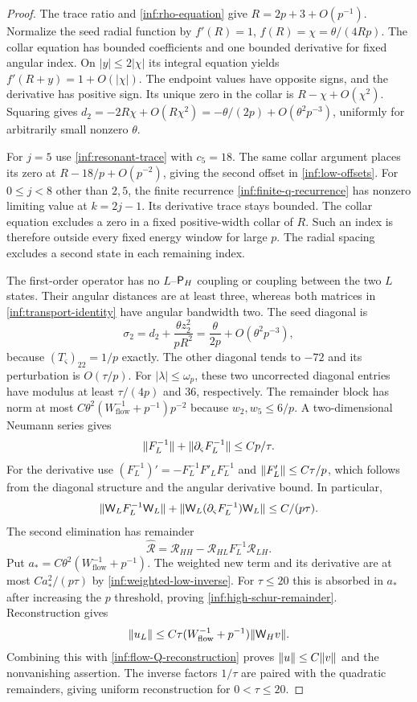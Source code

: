 \begin{proof}
The trace ratio and \eqref{inf:rho-equation} give
$R=2p+3+O(p^{-1})$. Normalize the seed radial function by
$f'(R)=1$, $f(R)=\chi=\theta/(4Rp)$.
The collar equation has bounded coefficients and one bounded
derivative for fixed angular index. On $|y|\le2|\chi|$ its integral
equation yields $f'(R+y)=1+O(|\chi|)$. The endpoint values have
opposite signs, and the derivative has positive sign.
Its unique zero in the collar is
$R-\chi+O(\chi^2)$. Squaring gives
$d_2=-2R\chi+O(R\chi^2)=-\theta/(2p)+O(\theta^2p^{-3})$,
uniformly for arbitrarily small nonzero $\theta$.

For $j=5$ use \eqref{inf:resonant-trace} with $c_5=18$.
The same collar argument places its zero at
$R-18/p+O(p^{-2})$, giving the second offset in
\eqref{inf:low-offsets}. For $0\le j<8$ other than $2,5$, the
finite recurrence \eqref{inf:finite-q-recurrence} has nonzero
limiting value at $k=2j-1$. Its derivative trace stays bounded.
The collar equation excludes a zero in a fixed positive-width
collar of $R$. Such an index is therefore outside every fixed
energy window for large $p$. The radial spacing excludes a second
state in each remaining index.

The first-order operator has no $L$--$\mathsf P_H$ coupling or coupling
between the two $L$ states. Their angular distances are at least
three, whereas both matrices in
\eqref{inf:transport-identity} have angular bandwidth two.
The seed diagonal is
\[
 \sigma_2=d_2+\frac{\theta z_2^2}{pR^2}
          =\frac{\theta}{2p}+O(\theta^2p^{-3}),
\]
because $(T_\varsigma)_{22}=1/p$ exactly. The other diagonal tends to $-72$
and its perturbation is $O(\tau/p)$.
For $|\lambda|\le\omega_p$, these two uncorrected diagonal entries
have modulus at least $\tau/(4p)$ and $36$, respectively.
The remainder block has norm at most
$C\theta^2(W_{\mathrm{flow}}^{-1}+p^{-1})p^{-2}$ because
$w_2,w_5\le6/p$. A two-dimensional Neumann series gives
\[
 \lVert F_L^{-1}\rVert+\lVert \partial_{\varsigma}F_L^{-1}\rVert\le Cp/\tau.
\]
For the derivative use
$(F_L^{-1})'=-F_L^{-1}F'_LF_L^{-1}$ and
$\lVert F'_L\rVert\le C\tau/p$, which follows from the diagonal structure
and the angular derivative bound. In particular,
\begin{equation}\label{inf:weighted-low-inverse}
 \lVert \mathsf W_LF_L^{-1}\mathsf W_L\rVert+
 \lVert \mathsf W_L(\partial_{\varsigma}F_L^{-1})\mathsf W_L\rVert
 \le C/(p\tau).
\end{equation}
The second elimination has remainder
\[
 \widehat{\mathcal R}
 =\mathcal R_{HH}-\mathcal R_{HL}F_L^{-1}\mathcal R_{LH}.
\]
Put $a_*=C\theta^2(W_{\mathrm{flow}}^{-1}+p^{-1})$.
The weighted new term and its derivative are at most
$Ca_*^2/(p\tau)$ by \eqref{inf:weighted-low-inverse}.
For $\tau\le20$ this is absorbed in $a_*$ after increasing the
$p$ threshold, proving \eqref{inf:high-schur-remainder}.
Reconstruction gives
\[
 \lVert u_L\rVert\le C\tau(W_{\mathrm{flow}}^{-1}+p^{-1})
                           \lVert \mathsf W_Hv\rVert.
\]
Combining this with \eqref{inf:flow-Q-reconstruction} proves
$\lVert u\rVert\le C\lVert v\rVert$ and the nonvanishing assertion.
The inverse factors $1/\tau$ are paired with the quadratic
remainders, giving uniform reconstruction for $0<\tau\le20$.
\end{proof}

